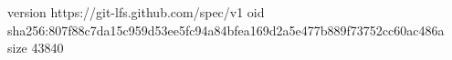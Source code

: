 version https://git-lfs.github.com/spec/v1
oid sha256:807f88c7da15c959d53ee5fc94a84bfea169d2a5e477b889f73752cc60ac486a
size 43840
